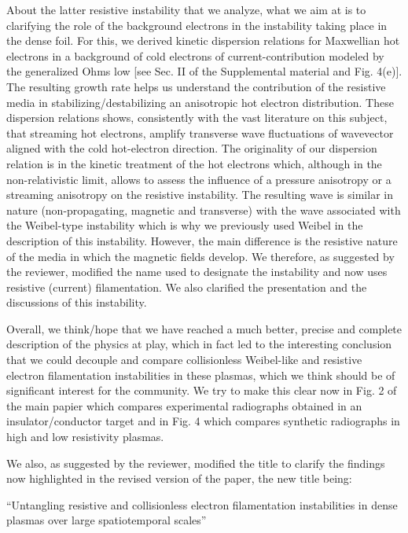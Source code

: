 \documentclass{article}
\begin{document}
\begin{enumerate}
About the latter resistive instability that we analyze, what we aim at is to clarifying the role of the background electrons in the  instability taking place in the dense foil.
For this, 
we derived kinetic dispersion relations for Maxwellian hot electrons in a background of cold electrons of current-contribution modeled by the generalized Ohms low [see Sec. II of the Supplemental material and Fig. 4(e)]. 
The resulting growth rate helps us understand the contribution of the resistive media in stabilizing/destabilizing an anisotropic hot electron distribution. These dispersion relations shows, consistently with the vast literature on this subject,  that streaming hot electrons, amplify transverse wave fluctuations of wavevector aligned with the cold hot-electron direction. 
The originality of our dispersion relation is in the kinetic treatment of the hot electrons which, although in the non-relativistic limit, allows to assess the influence of a pressure anisotropy or a streaming anisotropy  on the resistive instability. 
The resulting wave is  similar in nature  (non-propagating, magnetic and transverse)  with the wave associated with the Weibel-type instability which is why we previously used Weibel in the description of this instability.  
However,  the main difference is the resistive nature of the media in which the magnetic fields  develop.  We therefore, as suggested by the reviewer, modified the name used to designate the instability and now uses resistive (current) filamentation. We also clarified the presentation and the discussions of this instability.

Overall, we think/hope that  we have reached a much better, precise and complete description of the physics at play, which in fact led to the interesting conclusion that we could decouple and compare collisionless Weibel-like and resistive electron filamentation instabilities in these plasmas, which we think should be of significant interest for the community.
We try to make this clear now in Fig. 2  of the main papier which compares experimental radiographs obtained in an  insulator/conductor target and in Fig. 4 which compares synthetic radiographs in high and low resistivity plasmas.

We also, as suggested by the reviewer, modified the title to clarify the findings now highlighted in the revised version of the paper, the new title being:

“Untangling resistive and collisionless electron filamentation instabilities in dense plasmas over large spatiotemporal scales”



\end{enumerate}
\end{document}
